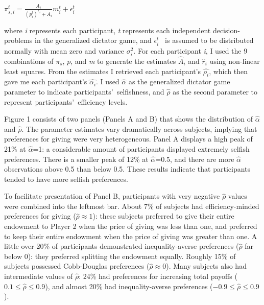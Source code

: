 \documentclass[12pt]{article}
\begin{document}
\vspace{3mm} \( \pi^{t}_{s,i} = \frac{A_{i}}{(p^{t}_{i})^{r_{i}} + A_{i}}m^{t}_{i} + \epsilon^{t}_{i}\)
 
\vspace{3mm} \noindent where \textit{i} represents each participant, \textit{t} represents each independent decision-problems in the generalized dictator game, and \( \epsilon^{t}_{i} \) \ is assumed to be distributed normally with mean zero and variance \(\sigma^{2}_{i}\). For each participant \textit{i}, I used the 9 combinations of \(\pi_{s}\), \(p\), and \textit{m} to generate the estimates  \( \hat{A}_{i} \) and \( \hat{r}_{i} \) using non-linear least squares. From the estimates I retrieved each participant\rq s \( \hat{\rho_{i}}\), which then gave me each participant\rq s \( \hat{\alpha_{i}} \). I used \(\hat{\alpha}\) as the generalized dictator game parameter to indicate participants\rq \ selfishness, and \(\hat{\rho}\) as the second parameter to represent participants\rq \ efficiency levels.

Figure 1 consists of two panels (Panels A and B) that shows the distribution of  \(\hat{\alpha}\) and \(\hat{\rho}\). The parameter estimates vary dramatically across subjects, implying that preferences for giving were very heterogeneous. Panel A displays a high peak of 21\% at \(\hat{\alpha}\)=1: a considerable amount of participants displayed extremely selfish preferences. There is a smaller peak of 12\% at \(\hat{\alpha}\)=0.5, and there are more \(\hat{\alpha}\) observations above 0.5 than below 0.5. These results indicate that participants tended to have more selfish preferences. 

To facilitate presentation of Panel B, participants with very negative \(\hat{\rho}\) values were combined into the leftmost bar. About 7\% of subjects had efficiency-minded preferences for giving (\(\hat{\rho} \approx 1\)): these subjects preferred to give their entire endowment to Player 2 when the price of giving was less than one, and preferred to keep their entire endowment when the price of giving was greater than one. A little over 20\% of participants demonstrated inequality-averse preferences (\(\hat{\rho}\) far below 0): they preferred splitting the endowment equally. Roughly 15\% of subjects possessed Cobb-Douglas preferences (\(\hat{\rho} \approx 0\)). Many subjects also had intermediate values of \(\hat{\rho}\): 24\% had preferences for increasing total payoffs (\(0.1 \leq \hat{\rho} \leq 0.9\)), and almost 20\% had inequality-averse preferences (\(-0.9 \leq \hat{\rho} \leq 0.9\)).
\end{document}
